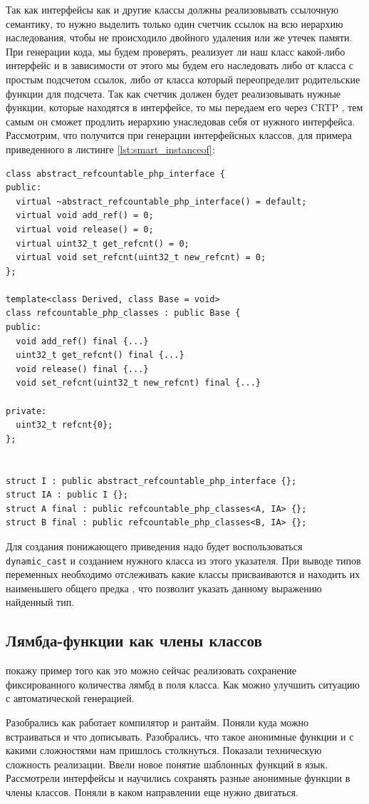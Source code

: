 Так как интерфейсы как и другие классы должны реализовывать ссылочную семантику, то нужно выделить только один счетчик ссылок на всю иерархию наследования, чтобы не происходило двойного удаления или же утечек памяти.
При генерации кода, мы будем проверять, реализует ли наш класс какой-либо интерфейс и в зависимости от этого мы будем его наследовать либо от класса с простым подсчетом ссылок, либо от класса который переопределит родительские функции для подсчета.
Так как счетчик должен будет реализовывать нужные функции, которые находятся в интерфейсе, то мы передаем его через CRTP , тем самым он сможет продлить иерархию унаследовав себя от нужного интерфейса.
Рассмотрим, что получится при генерации интерфейсных классов, для примера приведенного в листинге \ref{lst:smart_instanceof}:
\begin{lstlisting}
class abstract_refcountable_php_interface {
public:
  virtual ~abstract_refcountable_php_interface() = default;
  virtual void add_ref() = 0;
  virtual void release() = 0;
  virtual uint32_t get_refcnt() = 0;
  virtual void set_refcnt(uint32_t new_refcnt) = 0;
};

template<class Derived, class Base = void>
class refcountable_php_classes : public Base {
public:
  void add_ref() final {...}
  uint32_t get_refcnt() final {...}
  void release() final {...}
  void set_refcnt(uint32_t new_refcnt) final {...}

private:
  uint32_t refcnt{0};
};


struct I : public abstract_refcountable_php_interface {};
struct IA : public I {};
struct A final : public refcountable_php_classes<A, IA> {};
struct B final : public refcountable_php_classes<B, IA> {};
\end{lstlisting}

Для создания понижающего приведения надо будет воспользоваться \verb|dynamic_cast| и созданием нужного класса из этого указателя.
При выводе типов переменных необходимо отслеживать какие классы присваиваются и находить их наименьшего общего предка \cite{lca}, что позволит указать данному выражению найденный тип.

\subsection{Лямбда-функции как члены классов}
покажу пример того как это можно сейчас реализовать сохранение фиксированного количества лямбд в поля класса.
Как можно улучшить ситуацию с автоматической генерацией.

\chapterconclusion
Разобрались как работает компилятор и рантайм.
Поняли куда можно встраиваться и что дописывать.
Разобрались, что такое анонимные функции и с какими сложностями нам пришлось столкнуться.
Показали техническую сложность реализации.
Ввели новое понятие шаблонных функций в язык.
Рассмотрели интерфейсы и научились сохранять разные анонимные функции в члены классов.
Поняли в каком направлении еще нужно двигаться.
